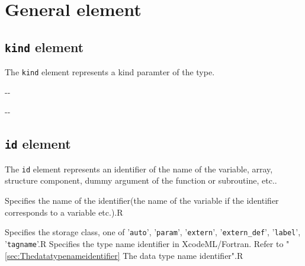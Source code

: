 \section{General element}


\subsection{ {\tt kind} element}

The {\tt kind} element represents a kind paramter of the type.


\begin{XcodeMLChildElements}
\XcodeMLElementDef{-}
{-}{-}
\end{XcodeMLChildElements}

\begin{XcodeMLAttributes}
\XcodeMLAttrDef{-}{-}
{-}{-}
\end{XcodeMLAttributes}


\subsection{ {\tt id} element}

The {\tt id} element represents an identifier of the name of the variable, array,
structure component, dummy argument of the function or subroutine, etc..


\begin{XcodeMLChildElements}
{Specifies the name of the identifier(the name of the variable if the identifier corresponds to a variable etc.).}{R}
\end{XcodeMLChildElements}

\begin{XcodeMLAttributes}
{Specifies the storage class, one of '{\tt auto}', '{\tt param}', '{\tt extern}', '{\tt extern\_def}', '{\tt label}', '{\tt tagname}'.}{R}
{Specifies the type name identifier in XcodeML/Fortran.
 Refer to "\ref{sec:Thedatatypenameidentifier} The data type name identifier".}{R}
\end{XcodeMLAttributes}

